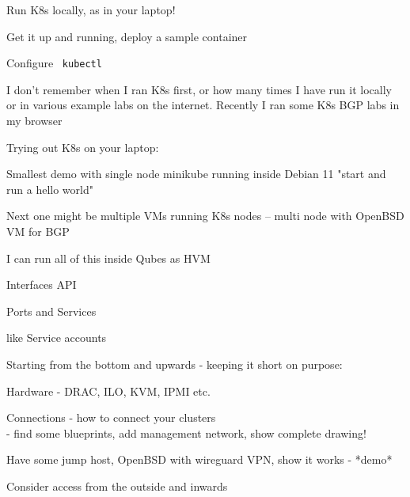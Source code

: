 \documentclass[Screen16to9,17pt]{foils}
\begin{document}



\begin{list2}
\item Run K8s locally, as in your laptop!
\item Get it up and running, deploy a sample container
\item Configure \faWrench\ \verb+kubectl+
\end{list2}

I don't remember when I ran K8s first, or how many times I have run it locally or in various example labs on the internet. Recently I ran some K8s BGP labs in my browser

Trying out K8s on your laptop:

\begin{list2}
\item Smallest demo with single node minikube running inside Debian 11
    "start and run a hello world"
\item Next one might be multiple VMs running K8s nodes -- multi node with OpenBSD VM for BGP
\item I can run all of this inside Qubes as HVM
\end{list2}



\begin{list2}
\item Interfaces API
\item Ports and Services
\end{list2}



\begin{list2}
\item like Service accounts
\end{list2}



Starting from the bottom and upwards - keeping it short on purpose:
\begin{list2}
\item Hardware - DRAC, ILO, KVM, IPMI etc.
\item Connections - how to connect your clusters\\
- find some blueprints, add management network, show complete drawing!
\item Have some jump host, OpenBSD with wireguard VPN, show it works - *demo*
\item Consider access from the outside and inwards
\end{list2}
\end{document}
